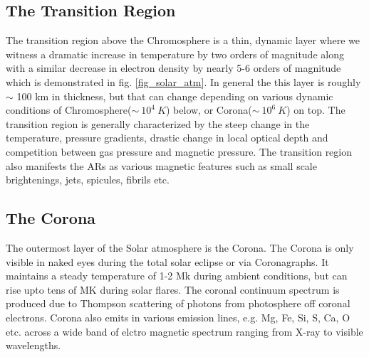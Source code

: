 \subsection{The Transition Region}\label{transition-region}

The transition region above the Chromosphere is a thin, dynamic layer where we witness a dramatic increase in temperature by two orders of magnitude along with a similar decrease in electron density by nearly 5-6 orders of magnitude which is demonstrated in fig. \ref{fig_solar_atm}. In general the this layer is roughly $\sim$ 100 km in thickness, but that can change depending on various dynamic conditions of Chromosphere($\sim~10^{4}~K$) below, or Corona($\sim~10^{6}~K$) on top. The transition region is generally characterized by the steep change in the temperature, pressure gradients, drastic change in local optical depth and competition between gas pressure and magnetic pressure. The transition region also manifests the ARs as various magnetic features such as small scale brightenings, jets, spicules, fibrils etc. 

\subsection{The Corona}\label{corona}

The outermost layer of the Solar atmosphere is the Corona. The Corona is only visible in naked eyes during the total solar eclipse or via Coronagraphs. It maintains a steady temperature of 1-2 Mk during ambient conditions, but can rise upto tens of MK during solar flares. The coronal continuum spectrum is produced due to Thompson scattering of photons from photosphere off coronal electrons. Corona also emits in various emission lines, e.g. Mg, Fe, Si, S, Ca, O etc. across a wide band of elctro magnetic spectrum ranging from X-ray to visible wavelengths. 

